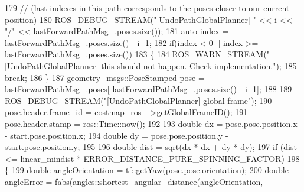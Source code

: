 \begin{DoxyCode}
179                     \textcolor{comment}{// (last indexes in this path corresponds to the poses closer to our current position)}
180                     ROS\_DEBUG\_STREAM(\textcolor{stringliteral}{"[UndoPathGlobalPlanner] "} << i << \textcolor{stringliteral}{"/"} << 
      \hyperlink{classcl__move__base__z_1_1undo__path__global__planner_1_1UndoPathGlobalPlanner_a9a4a6e40f5b6cb5f77dedbc5b6170871}{lastForwardPathMsg\_}.poses.size());
181                     \textcolor{keyword}{auto} index = \hyperlink{classcl__move__base__z_1_1undo__path__global__planner_1_1UndoPathGlobalPlanner_a9a4a6e40f5b6cb5f77dedbc5b6170871}{lastForwardPathMsg\_}.poses.size() - i -1;
182                     \textcolor{keywordflow}{if}(index < 0 || index >= \hyperlink{classcl__move__base__z_1_1undo__path__global__planner_1_1UndoPathGlobalPlanner_a9a4a6e40f5b6cb5f77dedbc5b6170871}{lastForwardPathMsg\_}.poses.size())
183                     \{
184                         ROS\_WARN\_STREAM(\textcolor{stringliteral}{"[UndoPathGlobalPlanner] this should not happen. Check
       implementation."});
185                         \textcolor{keywordflow}{break};
186                     \}
187                     geometry\_msgs::PoseStamped pose = \hyperlink{classcl__move__base__z_1_1undo__path__global__planner_1_1UndoPathGlobalPlanner_a9a4a6e40f5b6cb5f77dedbc5b6170871}{lastForwardPathMsg\_}.poses[
      \hyperlink{classcl__move__base__z_1_1undo__path__global__planner_1_1UndoPathGlobalPlanner_a9a4a6e40f5b6cb5f77dedbc5b6170871}{lastForwardPathMsg\_}.poses.size() - i -1];
188                     
189                     ROS\_DEBUG\_STREAM(\textcolor{stringliteral}{"[UndoPathGlobalPlanner] global frame"});
190                     pose.header.frame\_id = \hyperlink{classcl__move__base__z_1_1undo__path__global__planner_1_1UndoPathGlobalPlanner_ab63eeb465e3ae989a6edcc4d059cf8f0}{costmap\_ros\_}->getGlobalFrameID();
191                     pose.header.stamp = ros::Time::now();
192 
193                     \textcolor{keywordtype}{double} dx = pose.pose.position.x - start.pose.position.x;
194                     \textcolor{keywordtype}{double} dy = pose.pose.position.y - start.pose.position.y;
195 
196                     \textcolor{keywordtype}{double} dist = sqrt(dx * dx + dy * dy);
197                     \textcolor{keywordflow}{if} (dist <= linear\_mindist * ERROR\_DISTANCE\_PURE\_SPINNING\_FACTOR)
198                     \{
199                         \textcolor{keywordtype}{double} angleOrientation = tf::getYaw(pose.pose.orientation);
200                         \textcolor{keywordtype}{double} angleError = fabs(angles::shortest\_angular\_distance(angleOrientation, 

\end{DoxyCode}
